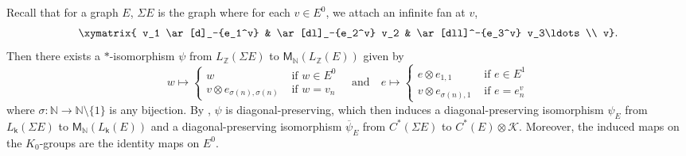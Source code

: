 \documentclass[11pt, letterpaper,final]{amsart}
\newcommand{\ZZ}{\mathbb{Z}}
\newcommand{\NN}{\mathbb{N}}
\newcommand{\Kk}{\mathcal{K}}
\theoremstyle{definition}
\theoremstyle{remark}
\begin{document}
Recall that for a graph $E$, $\Sigma E$ is the graph where for each $v \in E^0$, we attach an infinite fan at $v$,
\[
\xymatrix{ v_1 \ar[d]_-{e_1^v} &  \ar[dl]_-{e_2^v} v_2  & \ar[dll]^-{e_3^v} v_3\ldots    \\ 
         v}.
\]
Then there exists a $*$-isomorphism $\psi$ from $L_\ZZ(\Sigma E)$ to $\mathsf{M}_\NN(L_\ZZ(E))$ given by 
\[ w \mapsto \begin{cases} w &\text{ if } w \in E^0 \\ v \otimes e_{\sigma(n), \sigma(n)} &\text{ if } w = v_n  \end{cases} \quad \text{and} \quad e \mapsto \begin{cases} e \otimes e_{1,1} &\text{ if } e \in E^1 \\ v \otimes e_{\sigma(n), 1 } &\text{ if } e = e_n^v \end{cases} \] where $\sigma \colon \NN \to \NN\setminus \{1\}$ is any bijection.  By \cite{Stein2024}, $\psi$ is diagonal-preserving, which then induces a diagonal-preserving isomorphism $\psi_E$ from $L_\mathsf{k}(\Sigma E)$ to $\mathsf{M}_\NN(L_\mathsf{k}(E))$ and a diagonal-preserving isomorphism $\overline{\psi}_E$ from $C^*(\Sigma E)$ to $C^*(E) \otimes \Kk$.  Moreover, the induced maps on the $K_0$-groups are the identity maps on $E^0$.
\end{document}
